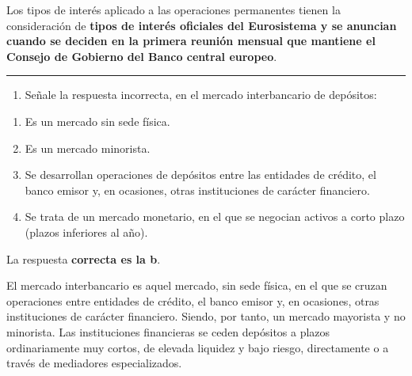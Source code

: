 \documentclass[
  letterpaper,
  DIV=11,
  numbers=noendperiod]{scrreprt}
\providecommand{\tightlist}{%
  \setlength{\itemsep}{0pt}\setlength{\parskip}{0pt}}\usepackage{longtable,booktabs,array}
\begin{document}
\begin{tcolorbox}[enhanced jigsaw, left=2mm, opacityback=0, colback=white, breakable, arc=.35mm, bottomrule=.15mm, rightrule=.15mm, toprule=.15mm, leftrule=.75mm, colframe=quarto-callout-tip-color-frame]
\begin{minipage}[t]{\textwidth - 5.5mm}
Los tipos de interés aplicado a las operaciones permanentes tienen la
consideración de \textbf{tipos de interés oficiales del Eurosistema y se
anuncian cuando se deciden en la primera reunión mensual que mantiene el
Consejo de Gobierno del Banco central europeo}.

\end{minipage}%
\end{tcolorbox}

\begin{center}\rule{0.5\linewidth}{0.5pt}\end{center}

\begin{enumerate}
\def\labelenumi{\arabic{enumi}.}
\setcounter{enumi}{4}
\tightlist
\item
  Señale la respuesta incorrecta, en el mercado interbancario de
  depósitos:
\end{enumerate}

\begin{enumerate}
\def\labelenumi{\alph{enumi})}
\item
  Es un mercado sin sede física.
\item
  Es un mercado minorista.
\item
  Se desarrollan operaciones de depósitos entre las entidades de
  crédito, el banco emisor y, en ocasiones, otras instituciones de
  carácter financiero.
\item
  Se trata de un mercado monetario, en el que se negocian activos a
  corto plazo (plazos inferiores al año).
\end{enumerate}

\begin{tcolorbox}[enhanced jigsaw, left=2mm, opacityback=0, colback=white, breakable, arc=.35mm, bottomrule=.15mm, rightrule=.15mm, toprule=.15mm, leftrule=.75mm, colframe=quarto-callout-tip-color-frame]
\begin{minipage}[t]{5.5mm}
\textcolor{quarto-callout-tip-color}{\faLightbulb}
\end{minipage}%
\begin{minipage}[t]{\textwidth - 5.5mm}

La respuesta \textbf{correcta es la b}.

El mercado interbancario es aquel mercado, sin sede física, en el que se
cruzan operaciones entre entidades de crédito, el banco emisor y, en
ocasiones, otras instituciones de carácter financiero. Siendo, por
tanto, un mercado mayorista y no minorista. Las instituciones
financieras se ceden depósitos a plazos ordinariamente muy cortos, de
elevada liquidez y bajo riesgo, directamente o a través de mediadores
especializados.

\end{minipage}%
\end{tcolorbox}
\end{document}

